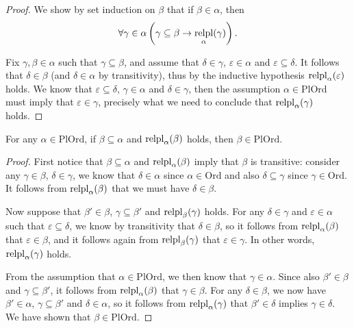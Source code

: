 \documentclass[12pt,openany]{book}
\theoremstyle{plain}
\theoremstyle{definition}
\newcommand\opA[1]{\mathop{\forall #1}}
\DeclareMathOperator\relpl{relpl}
\newcommand\Ord{\mathrm{Ord}}
\newcommand\PlOrd{\mathrm{PlOrd}}
\begin{document}
\begin{proof}
  We show by set induction on $\beta$ that if $\beta \in \alpha$, then
  \[\opA{\gamma \in \alpha} \left(\gamma \subseteq \beta \rightarrow \relpl_\alpha\mleft(\gamma\mright)\right).\]

  Fix $\gamma, \beta \in \alpha$ such that $\gamma \subseteq \beta$, and assume that $\delta \in \gamma$, $\varepsilon \in \alpha$ and $\varepsilon \subseteq \delta$. It follows that $\delta \in \beta$ (and $\delta \in \alpha$ by transitivity), thus by the inductive hypothesis $\relpl_\alpha\mleft(\varepsilon\mright)$ holds. We know that $\varepsilon \subseteq \delta$, $\gamma \in \alpha$ and $\delta \in \gamma$, then the assumption $\alpha \in \PlOrd$ must imply that $\varepsilon \in \gamma$, precisely what we need to conclude that $\relpl_\alpha\mleft(\gamma\mright)$ holds.
\end{proof}

\begin{lemma}
  \label{lem:pl-ord-subset-rel-pl-is-pl-ord}
  For any $\alpha \in \PlOrd$, if $\beta \subseteq \alpha$ and $\relpl_\alpha\mleft(\beta\mright)$ holds, then $\beta \in \PlOrd$.
\end{lemma}

\begin{proof}
  First notice that $\beta \subseteq \alpha$ and $\relpl_\alpha\mleft(\beta\mright)$ imply that $\beta$ is transitive: consider any $\gamma \in \beta$, $\delta \in \gamma$, we know that $\delta \in \alpha$ since $\alpha \in \Ord$ and also $\delta \subseteq \gamma$ since $\gamma \in \Ord$. It follows from $\relpl_\alpha\mleft(\beta\mright)$ that we must have $\delta \in \beta$.

  Now suppose that $\beta' \in \beta$, $\gamma \subseteq \beta'$ and $\relpl_\beta\mleft(\gamma\mright)$ holds. For any $\delta \in \gamma$ and $\varepsilon \in \alpha$ such that $\varepsilon \subseteq \delta$, we know by transitivity that $\delta \in \beta$, so it follows from $\relpl_\alpha\mleft(\beta\mright)$ that $\varepsilon \in \beta$, and it follows again from $\relpl_\beta\mleft(\gamma\mright)$ that $\varepsilon \in \gamma$. In other words, $\relpl_\alpha\mleft(\gamma\mright)$ holds.

  From the assumption that $\alpha \in \PlOrd$, we then know that $\gamma \in \alpha$. Since also $\beta' \in \beta$ and $\gamma \subseteq \beta'$, it follows from $\relpl_\alpha\mleft(\beta\mright)$ that $\gamma \in \beta$. For any $\delta \in \beta$, we now have $\beta' \in \alpha$, $\gamma \subseteq \beta'$ and $\delta \in \alpha$, so it follows from $\relpl_\alpha\mleft(\gamma\mright)$ that $\beta' \in \delta$ implies $\gamma \in \delta$. We have shown that $\beta \in \PlOrd$.
\end{proof}
\end{document}
